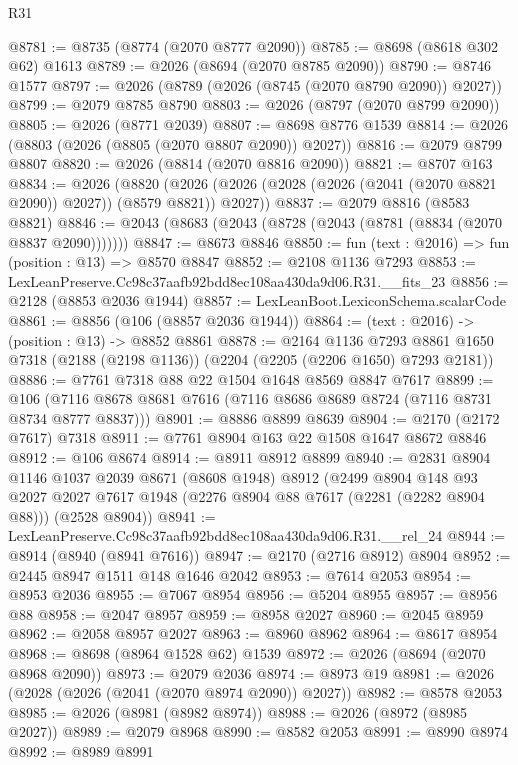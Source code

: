 \begin{lexlean}{R31}
\begin{coremodule}
@8781 := @8735 (@8774 (@2070 @8777 @2090))
@8785 := @8698 (@8618 @302 @62) @1613
@8789 := @2026 (@8694 (@2070 @8785 @2090))
@8790 := @8746 @1577
@8797 := @2026 (@8789 (@2026 (@8745 (@2070 @8790 @2090)) @2027))
@8799 := @2079 @8785 @8790
@8803 := @2026 (@8797 (@2070 @8799 @2090))
@8805 := @2026 (@8771 @2039)
@8807 := @8698 @8776 @1539
@8814 := @2026 (@8803 (@2026 (@8805 (@2070 @8807 @2090)) @2027))
@8816 := @2079 @8799 @8807
@8820 := @2026 (@8814 (@2070 @8816 @2090))
@8821 := @8707 @163
@8834 := @2026
    (@8820 (@2026 (@2026 (@2028 (@2026 (@2041 (@2070 @8821 @2090)) @2027)) (@8579 @8821)) @2027))
@8837 := @2079 @8816 (@8583 @8821)
@8846 := @2043 (@8683 (@2043 (@8728 (@2043 (@8781 (@8834 (@2070 @8837 @2090)))))))
@8847 := @8673 @8846
@8850 := fun (text : @2016) => fun (position : @13) => @8570 @8847
@8852 := @2108 @1136 @7293
@8853 := LexLeanPreserve.Cc98c37aafb92bdd8ec108aa430da9d06.R31.__fits_23
@8856 := @2128 (@8853 @2036 @1944)
@8857 := LexLeanBoot.LexiconSchema.scalarCode
@8861 := @8856 (@106 (@8857 @2036 @1944))
@8864 := (text : @2016) -> (position : @13) -> @8852 @8861
@8878 := @2164
    @1136
    @7293
    @8861
    @1650
    @7318
    (@2188 (@2198 @1136))
    (@2204 (@2205 (@2206 @1650) @7293 @2181))
@8886 := @7761 @7318 @88 @22 @1504 @1648 @8569 @8847 @7617
@8899 := @106 (@7116 @8678 @8681 @7616 (@7116 @8686 @8689 @8724 (@7116 @8731 @8734 @8777 @8837)))
@8901 := @8886 @8899 @8639
@8904 := @2170 (@2172 @7617) @7318
@8911 := @7761 @8904 @163 @22 @1508 @1647 @8672 @8846
@8912 := @106 @8674
@8914 := @8911 @8912 @8899
@8940 := @2831
    @8904
    @1146
    @1037
    @2039
    @8671
    (@8608 @1948)
    @8912
    (@2499
      @8904
      @148
      @93
      @2027
      @2027
      @7617
      @1948
      (@2276 @8904 @88 @7617 (@2281 (@2282 @8904 @88)))
      (@2528 @8904))
@8941 := LexLeanPreserve.Cc98c37aafb92bdd8ec108aa430da9d06.R31.__rel_24
@8944 := @8914 (@8940 (@8941 @7616))
@8947 := @2170 (@2716 @8912) @8904
@8952 := @2445 @8947 @1511 @148 @1646 @2042
@8953 := @7614 @2053
@8954 := @8953 @2036
@8955 := @7067 @8954
@8956 := @5204 @8955
@8957 := @8956 @88
@8958 := @2047 @8957
@8959 := @8958 @2027
@8960 := @2045 @8959
@8962 := @2058 @8957 @2027
@8963 := @8960 @8962
@8964 := @8617 @8954
@8968 := @8698 (@8964 @1528 @62) @1539
@8972 := @2026 (@8694 (@2070 @8968 @2090))
@8973 := @2079 @2036
@8974 := @8973 @19
@8981 := @2026 (@2028 (@2026 (@2041 (@2070 @8974 @2090)) @2027))
@8982 := @8578 @2053
@8985 := @2026 (@8981 (@8982 @8974))
@8988 := @2026 (@8972 (@8985 @2027))
@8989 := @2079 @8968
@8990 := @8582 @2053
@8991 := @8990 @8974
@8992 := @8989 @8991

\end{coremodule}
\end{lexlean}

